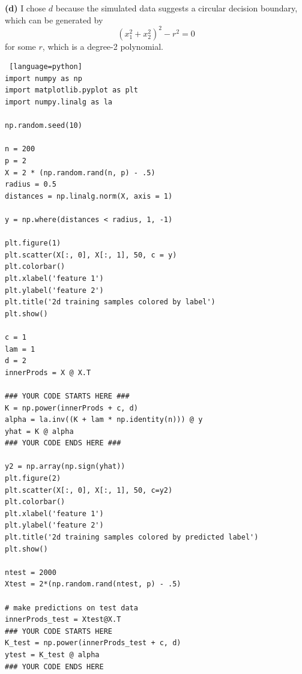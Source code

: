 \documentclass[a4paper, 12pt]{article}
\begin{document}
\begin{solution}
    \textbf{(d)} I chose $d$ because the simulated data suggests a circular decision boundary, which can be generated by \[
    (x_1^2 + x_2^2)^2 - r^2 = 0
    \]
    for some $r$, which is a degree-2 polynomial.

\begin{lstlisting} [language=python]
import numpy as np
import matplotlib.pyplot as plt
import numpy.linalg as la

np.random.seed(10)

n = 200
p = 2
X = 2 * (np.random.rand(n, p) - .5)
radius = 0.5
distances = np.linalg.norm(X, axis = 1)

y = np.where(distances < radius, 1, -1)

plt.figure(1)
plt.scatter(X[:, 0], X[:, 1], 50, c = y)
plt.colorbar()
plt.xlabel('feature 1')
plt.ylabel('feature 2')
plt.title('2d training samples colored by label')
plt.show()

c = 1
lam = 1
d = 2
innerProds = X @ X.T

### YOUR CODE STARTS HERE ###
K = np.power(innerProds + c, d)
alpha = la.inv((K + lam * np.identity(n))) @ y
yhat = K @ alpha
### YOUR CODE ENDS HERE ###

y2 = np.array(np.sign(yhat))
plt.figure(2)
plt.scatter(X[:, 0], X[:, 1], 50, c=y2)
plt.colorbar()
plt.xlabel('feature 1')
plt.ylabel('feature 2')
plt.title('2d training samples colored by predicted label')
plt.show()

ntest = 2000
Xtest = 2*(np.random.rand(ntest, p) - .5)

# make predictions on test data
innerProds_test = Xtest@X.T
### YOUR CODE STARTS HERE
K_test = np.power(innerProds_test + c, d)
ytest = K_test @ alpha
### YOUR CODE ENDS HERE


\end{lstlisting}
\end{solution}
\end{document}
